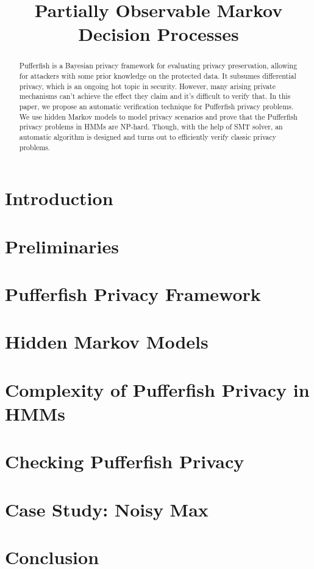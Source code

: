 \documentclass{llncs}
\title{Partially Observable Markov Decision Processes}
\begin{document}
\maketitle

\begin{abstract}
Pufferfish is a Bayesian privacy framework for evaluating
privacy preservation, allowing for attackers with some prior knowledge
on the protected data. It subsumes differential privacy, which is an ongoing hot 
topic in security. However, many arising private mechanisms can't achieve
the effect they claim and it's difficult to verify that. In this paper, we propose an automatic verification technique
for Pufferfish privacy problems. We use hidden Markov models to model privacy scenarios
and prove that the Pufferfish privacy problems in HMMs are NP-hard.
Though, with the help of SMT solver, an automatic algorithm is designed
and turns out to efficiently verify classic privacy problems.
\end{abstract}

\section{Introduction}
\label{section:introduction}


\section{Preliminaries}
\label{section:preliminaries}


\section{Pufferfish Privacy Framework}
\label{section:pufferfish}


\section{Hidden Markov Models}
\label{section:hmm}


\section{Complexity of Pufferfish Privacy in HMMs}
\label{section:complexity}


\section{Checking Pufferfish Privacy}
\label{section:checking-pufferfish}


\section{Case Study: Noisy Max}
\label{section:noisy-max}


\section{Conclusion}
\label{section:conclusion}




\end{document}

